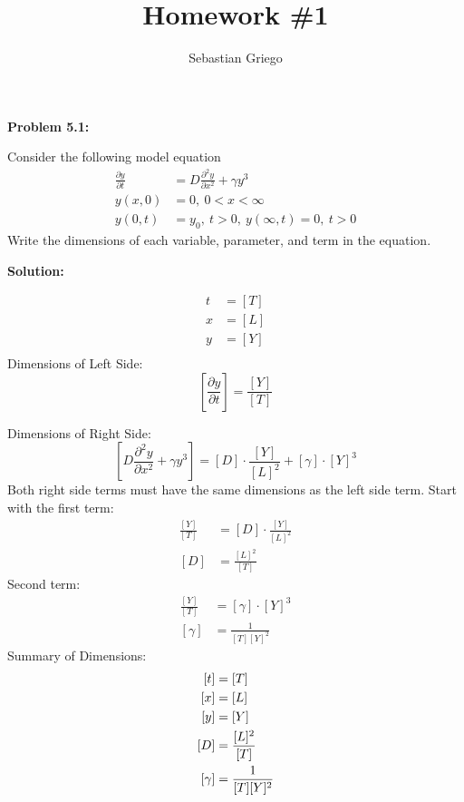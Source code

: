 \documentclass[12pt]{article}
\newenvironment{problem}[1]{
\textbf{Problem #1:}
}{
\rmfamily \vspace{1em}
}
\newenvironment{solution}{
\textbf{Solution:}

}{

\vspace{2em}
}
\begin{document}
\title{Homework \#1}  %
\author{Sebastian Griego}  %

\begin{problem}{5.1}
    Consider the following model equation
    \[
        \begin{aligned}
            \frac{\partial y}{\partial t} &= D\frac{\partial^2 y}{\partial x^2} + \gamma y^3 \\
            y(x,0) &= 0, \: 0 < x < \infty \\
            y(0,t) &= y_0, \: t > 0, \: y(\infty, t) = 0, \: t > 0
        \end{aligned}
    \]
    Write the dimensions of each variable, parameter, and term in the equation.
\end{problem}

\begin{solution}
    \[
        \begin{aligned}
            t &= [T] \\
            x &= [L] \\
            y &= [Y] \\
        \end{aligned}
    \]
    Dimensions of Left Side:
    \[
        \left[ \frac{\partial y}{\partial t} \right] = \frac{[Y]}{[T]}
    \]
    
    Dimensions of Right Side:
    \[
        \left[ D \frac{\partial^2 y}{\partial x^2} + \gamma y^3  \right] = [D] \cdot \frac{[Y]}{[L]^2} + [\gamma] \cdot [Y]^3
    \]
    Both right side terms must have the same dimensions as the left side term. Start with the first term:
    \[
        \begin{aligned}
            \frac{[Y]}{[T]} &= [D] \cdot \frac{[Y]}{[L]^2}\\
            [D] &= \frac{[L]^2}{[T]}
        \end{aligned}
    \]
    Second term:
    \[
        \begin{aligned}
            \frac{[Y]}{[T]} &= [\gamma] \cdot [Y]^3\\
            [\gamma] &= \frac{1}{[T][Y]^2}
        \end{aligned}
    \]
    Summary of Dimensions:
    \[
        \begin{aligned}\relax
            [t] &= [T] \\
            [x] &= [L] \\
            [y] &= [Y] \\
            [D] &= \frac{[L]^2}{[T]} \\
            [\gamma] &= \frac{1}{[T][Y]^2} \\
        \end{aligned}
    \]
\end{solution}
\end{document}
